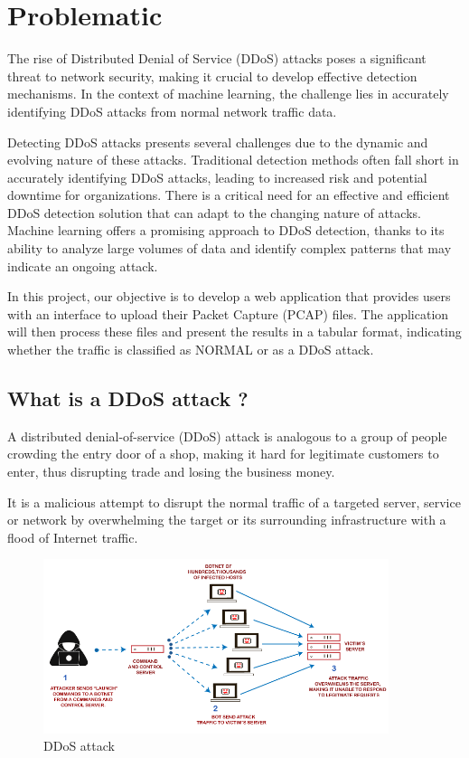 \chapter{Problematic}

\thispagestyle{empty}

The rise of Distributed Denial of Service (DDoS) attacks poses a significant threat to network security, making it crucial to develop effective detection mechanisms. In the context of machine learning, the challenge lies in accurately identifying DDoS attacks from normal network traffic data. 

Detecting DDoS attacks presents several challenges due to the dynamic and evolving nature of these attacks. Traditional detection methods often fall short in accurately identifying DDoS attacks, leading to increased risk and potential downtime for organizations. There is a critical need for an effective and efficient DDoS detection solution that can adapt to the changing nature of attacks. Machine learning offers a promising approach to DDoS detection, thanks to its ability to analyze large volumes of data and identify complex patterns that may indicate an ongoing attack. 

In this project, our objective is to develop a web application that provides users with an interface to upload their Packet Capture (PCAP) files. The application will then process these files and present the results in a tabular format, indicating whether the traffic is classified as NORMAL or as a DDoS attack.


\section{What is a DDoS attack ?}

A distributed denial-of-service (DDoS) attack is analogous to a group of people crowding the entry door of a shop, making it hard for legitimate customers to enter, thus disrupting trade and losing the business money. 

It is a malicious attempt to disrupt the normal traffic of a targeted server, service or network by overwhelming the target or its surrounding infrastructure with a flood of Internet traffic.
\begin{figure}[h]
	\centering
	\includegraphics[width=0.9\textwidth]{./assets/images/what-is-ddos-attack.png}
	\caption{DDoS attack}
\end{figure}

